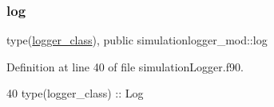\subsubsection{\texorpdfstring{log}{log}}
{\footnotesize\ttfamily type(\mbox{\hyperlink{structsimulationlogger__mod_1_1logger__class}{logger\+\_\+class}}), public simulationlogger\+\_\+mod\+::log}



Definition at line 40 of file simulation\+Logger.\+f90.


\begin{DoxyCode}
40     \textcolor{keywordtype}{type}(logger\_class) :: Log
\end{DoxyCode}
